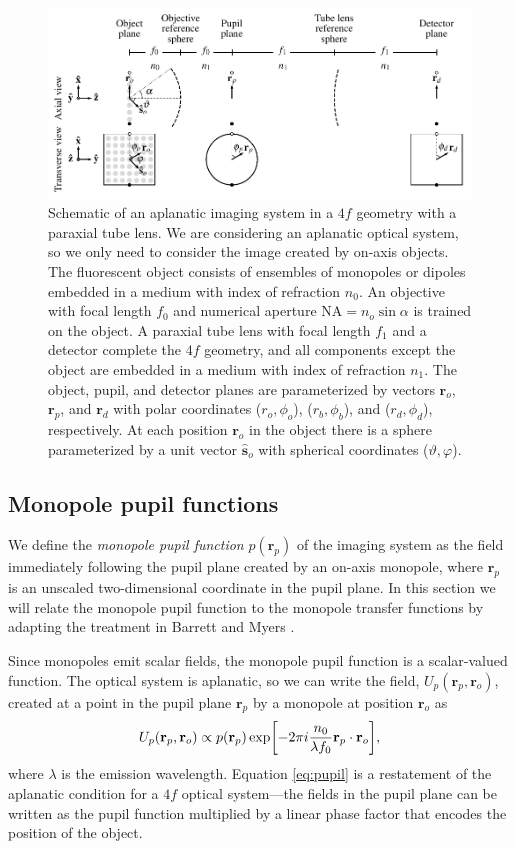 \documentclass[]{osa-article}
\let\originalleft\left
\let\originalright\right
\renewcommand{\left}{\mathopen{}\mathclose\bgroup\originalleft}
\renewcommand{\right}{\aftergroup\egroup\originalright}
\providecommand{\ro}{\mathbf{\mathbf{r}}_o}
\providecommand{\so}{\mathbf{\hat{s}}_o}
\providecommand{\rp}{\mathbf{r}_p}
\providecommand{\rd}{\mathbf{r}_d}
\begin{document}
\begin{figure}[ht]
 \centering
   \centering
   \includegraphics[width = 1.0\textwidth]{../figures/coordinates/detection-coords.pdf}
   \caption{Schematic of an aplanatic imaging system in a $4f$ geometry with a
     paraxial tube lens. We are considering an aplanatic optical system, so we
     only need to consider the image created by on-axis objects. The fluorescent
     object consists of ensembles of monopoles or dipoles embedded in a
     medium with index of refraction $n_0$. An objective with focal length $f_0$
     and numerical aperture $\text{NA} = n_o\sin\alpha$ is trained on the
     object. A paraxial tube lens with focal length $f_1$ and a detector
     complete the $4f$ geometry, and all components except the object are
     embedded in a medium with index of refraction $n_1$. The object, pupil, and
     detector planes are parameterized by vectors $\ro$, $\rp$, and $\rd$ with
     polar coordinates ($r_o, \phi_o$), ($r_b, \phi_b$), and ($r_d, \phi_d$),
     respectively. At each position $\ro$ in the object there is a sphere
     parameterized by a unit vector $\so$ with spherical coordinates
     ($\vartheta, \varphi$). }
   \label{fig:schematic}
 \end{figure}

\subsection{Monopole pupil functions}
We define the \textit{monopole pupil function} $p(\rp)$ of the imaging system as
the field immediately following the pupil plane created by an on-axis monopole,
where $\rp$ is an unscaled two-dimensional coordinate in the pupil plane. In
this section we will relate the monopole pupil function to the monopole transfer
functions by adapting the treatment in Barrett and Myers
\cite[ch.~9.7]{barrett2004}.

Since monopoles emit scalar fields, the monopole pupil function is a
scalar-valued function. The optical system is aplanatic, so we can write the
field, $U_p(\rp, \ro)$, created at a point in the pupil plane $\rp$ by a
monopole at position $\ro$ as
\begin{align}
   U_p(\rp, \ro) \propto p(\rp)\,\text{exp}\left[-2\pi i \frac{n_0}{\lambda f_0} \rp\cdot\ro \right], \label{eq:pupil}
\end{align}
where $\lambda$ is the emission wavelength. Equation \eqref{eq:pupil} is a
restatement of the aplanatic condition for a $4f$ optical system---the fields in
the pupil plane can be written as the pupil function multiplied by a linear
phase factor that encodes the position of the object.
\end{document}
